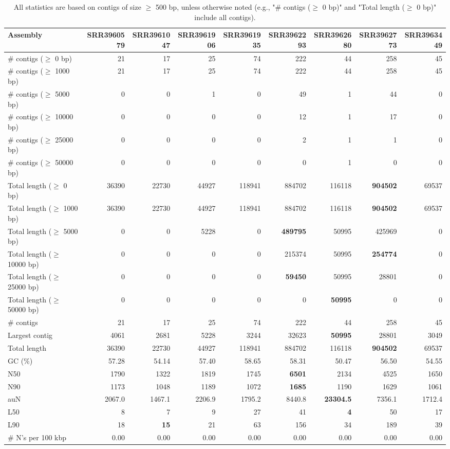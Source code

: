 \documentclass[12pt,a4paper]{article}
\begin{document}
\begin{table}[ht]
\begin{center}
\caption{All statistics are based on contigs of size $\geq$ 500 bp, unless otherwise noted (e.g., "\# contigs ($\geq$ 0 bp)" and "Total length ($\geq$ 0 bp)" include all contigs).}
\begin{tabular}{|l*{8}{|r}|}
\hline
Assembly & SRR3960579 & SRR3961047 & SRR3961906 & SRR3961935 & SRR3962293 & SRR3962680 & SRR3962773 & SRR3963449 \\ \hline
\# contigs ($\geq$ 0 bp) & 21 & 17 & 25 & 74 & 222 & 44 & 258 & 45 \\ \hline
\# contigs ($\geq$ 1000 bp) & 21 & 17 & 25 & 74 & 222 & 44 & 258 & 45 \\ \hline
\# contigs ($\geq$ 5000 bp) & 0 & 0 & 1 & 0 & 49 & 1 & 44 & 0 \\ \hline
\# contigs ($\geq$ 10000 bp) & 0 & 0 & 0 & 0 & 12 & 1 & 17 & 0 \\ \hline
\# contigs ($\geq$ 25000 bp) & 0 & 0 & 0 & 0 & 2 & 1 & 1 & 0 \\ \hline
\# contigs ($\geq$ 50000 bp) & 0 & 0 & 0 & 0 & 0 & 1 & 0 & 0 \\ \hline
Total length ($\geq$ 0 bp) & 36390 & 22730 & 44927 & 118941 & 884702 & 116118 & {\bf 904502} & 69537 \\ \hline
Total length ($\geq$ 1000 bp) & 36390 & 22730 & 44927 & 118941 & 884702 & 116118 & {\bf 904502} & 69537 \\ \hline
Total length ($\geq$ 5000 bp) & 0 & 0 & 5228 & 0 & {\bf 489795} & 50995 & 425969 & 0 \\ \hline
Total length ($\geq$ 10000 bp) & 0 & 0 & 0 & 0 & 215374 & 50995 & {\bf 254774} & 0 \\ \hline
Total length ($\geq$ 25000 bp) & 0 & 0 & 0 & 0 & {\bf 59450} & 50995 & 28801 & 0 \\ \hline
Total length ($\geq$ 50000 bp) & 0 & 0 & 0 & 0 & 0 & {\bf 50995} & 0 & 0 \\ \hline
\# contigs & 21 & 17 & 25 & 74 & 222 & 44 & 258 & 45 \\ \hline
Largest contig & 4061 & 2681 & 5228 & 3244 & 32623 & {\bf 50995} & 28801 & 3049 \\ \hline
Total length & 36390 & 22730 & 44927 & 118941 & 884702 & 116118 & {\bf 904502} & 69537 \\ \hline
GC (\%) & 57.28 & 54.14 & 57.40 & 58.65 & 58.31 & 50.47 & 56.50 & 54.55 \\ \hline
N50 & 1790 & 1322 & 1819 & 1745 & {\bf 6501} & 2134 & 4525 & 1650 \\ \hline
N90 & 1173 & 1048 & 1189 & 1072 & {\bf 1685} & 1190 & 1629 & 1061 \\ \hline
auN & 2067.0 & 1467.1 & 2206.9 & 1795.2 & 8440.8 & {\bf 23304.5} & 7356.1 & 1712.4 \\ \hline
L50 & 8 & 7 & 9 & 27 & 41 & {\bf 4} & 50 & 17 \\ \hline
L90 & 18 & {\bf 15} & 21 & 63 & 156 & 34 & 189 & 39 \\ \hline
\# N's per 100 kbp & 0.00 & 0.00 & 0.00 & 0.00 & 0.00 & 0.00 & 0.00 & 0.00 \\ \hline
\end{tabular}
\end{center}
\end{table}
\end{document}
